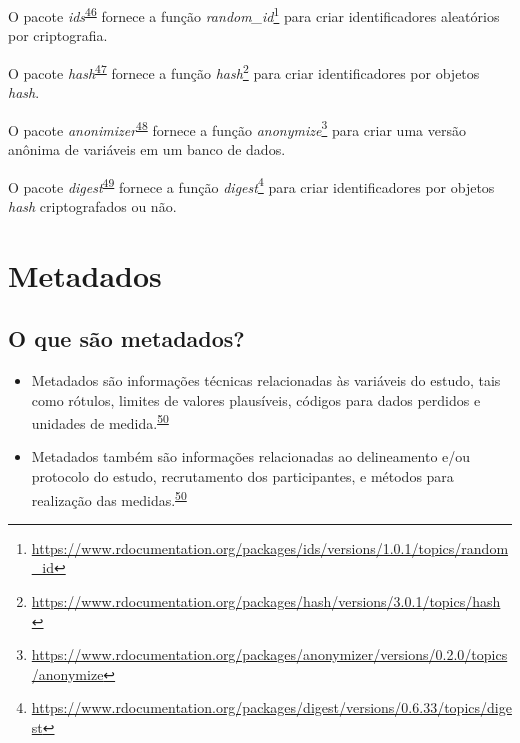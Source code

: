 \documentclass[
  a4paper,
]{book}
\renewcommand{\href}[2]{#2\footnote{\url{#1}}}
\newenvironment{infobox}[1]
  {
  \begin{itemize}
  \renewcommand{\labelitemi}{
    \raisebox{-.7\height}[0pt][0pt]{
      {\setkeys{Gin}{width=3em,keepaspectratio}
        \texttt{[image: \#1]}}
    }
  }
  \setlength{\fboxsep}{1em}
  \begin{blackbox}
  \item
  }
  {
  \end{blackbox}
  \end{itemize}
  }
\begin{document}
\begin{infobox}{images/Rlogo}
O pacote \emph{ids}\textsuperscript{\protect\hyperlink{ref-ids}{46}} fornece a função \href{https://www.rdocumentation.org/packages/ids/versions/1.0.1/topics/random_id}{\emph{random\_id}} para criar identificadores aleatórios por criptografia.

\end{infobox}

\begin{infobox}{images/Rlogo}
O pacote \emph{hash}\textsuperscript{\protect\hyperlink{ref-hash}{47}} fornece a função \href{https://www.rdocumentation.org/packages/hash/versions/3.0.1/topics/hash}{\emph{hash}} para criar identificadores por objetos \emph{hash}.

\end{infobox}

\begin{infobox}{images/Rlogo}
O pacote \emph{anonimizer}\textsuperscript{\protect\hyperlink{ref-anonymizer}{48}} fornece a função \href{https://www.rdocumentation.org/packages/anonymizer/versions/0.2.0/topics/anonymize}{\emph{anonymize}} para criar uma versão anônima de variáveis em um banco de dados.

\end{infobox}

\begin{infobox}{images/Rlogo}
O pacote \emph{digest}\textsuperscript{\protect\hyperlink{ref-digest}{49}} fornece a função \href{https://www.rdocumentation.org/packages/digest/versions/0.6.33/topics/digest}{\emph{digest}} para criar identificadores por objetos \emph{hash} criptografados ou não.

\end{infobox}

\hypertarget{metadados}{%
\section{Metadados}\label{metadados}}

\hypertarget{o-que-suxe3o-metadados}{%
\subsection{O que são metadados?}\label{o-que-suxe3o-metadados}}

\begin{itemize}
\item
  Metadados são informações técnicas relacionadas às variáveis do estudo, tais como rótulos, limites de valores plausíveis, códigos para dados perdidos e unidades de medida.\textsuperscript{\protect\hyperlink{ref-Baillie2022}{50}}
\item
  Metadados também são informações relacionadas ao delineamento e/ou protocolo do estudo, recrutamento dos participantes, e métodos para realização das medidas.\textsuperscript{\protect\hyperlink{ref-Baillie2022}{50}}
\end{itemize}
\end{document}
